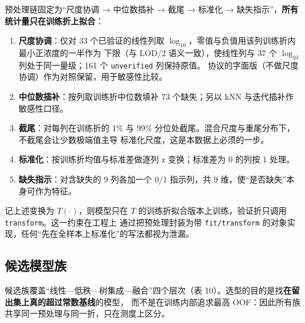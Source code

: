 \documentclass[
  a4paper,12pt]{article}
\providecommand{\tightlist}{%
  \setlength{\itemsep}{0pt}\setlength{\parskip}{0pt}}
\begin{document}
预处理链固定为``尺度协调 → 中位数插补 → 截尾 → 标准化 →
缺失指示''，\textbf{所有统计量只在训练折上拟合}：

\begin{enumerate}
\def\labelenumi{\arabic{enumi}.}
\tightlist
\item
  \textbf{尺度协调}：仅对 33 个已验证的线性列取
  \(\log_{10}\)，零值与负值用该列训练折内最小正浓度的一半作为 下限（与
  LOD/2 语义一致），使线性列与 37 个 \(\log_{10}\) 列处于同一量级；161
  个 \texttt{unverified} 列保持原值。
  协议的字面版（不做尺度协调）作为对照保留，用于敏感性比较。
\item
  \textbf{中位数插补}：按列取训练折中位数填补 73 个缺失；另以 kNN
  与迭代插补作敏感性口径。
\item
  \textbf{截尾}：对每列在训练折的 1\% 与 99\%
  分位处截尾。混合尺度与重尾分布下，不截尾会让少数极端值主导
  标准化尺度，这是本数据上必须的一步。
\item
  \textbf{标准化}：按训练折均值与标准差做逐列 z 变换；标准差为 0 的列按
  1 处理。
\item
  \textbf{缺失指示}：对含缺失的 9 列各加一个 0/1 指示列，共 9
  维，使``是否缺失''本身可作为特征。
\end{enumerate}

记上述变换为 \(T(\cdot)\)，则模型只在 \(T\)
的训练折拟合版本上训练，验证折只调用
\texttt{transform}。这一约束在工程上 通过把预处理封装为带
\texttt{fit/transform}
的对象实现，任何``先在全样本上标准化''的写法都视为泄漏。

\subsection{候选模型族}\label{ux5019ux9009ux6a21ux578bux65cf}

候选族覆盖``线性---低秩---树集成---融合''四个层次（表
10）。选型的目的是找\textbf{在留出集上真的超过常数基线}的模型，
而不是在训练内部追求最高
OOF：因此所有族共享同一预处理与同一折，只在测度上区分。
\end{document}
